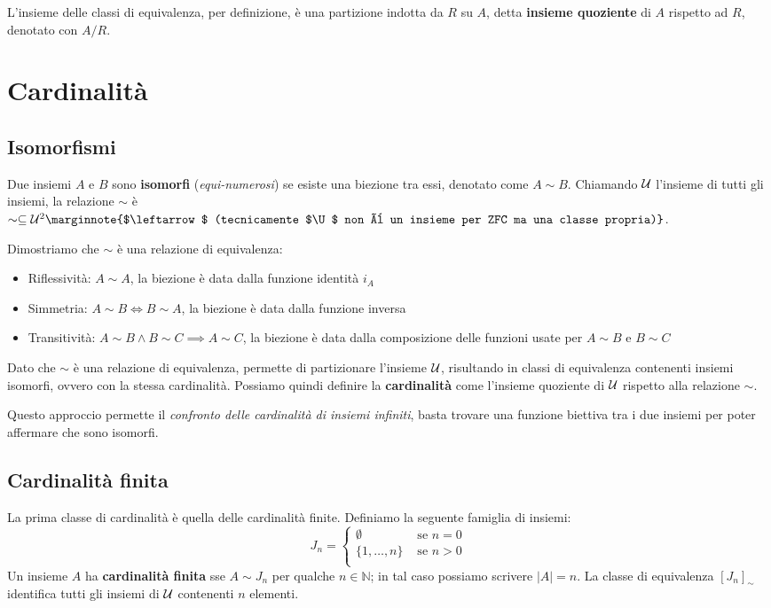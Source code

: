 L'insieme delle classi di equivalenza, per definizione, è una partizione indotta da $R$ su $A$, detta \textbf{insieme quoziente} di $A$ rispetto ad $R$, denotato con $A / R$.

\section{Cardinalità}

\subsection{Isomorfismi}

Due insiemi $A$ e $B$ sono \textbf{isomorfi} (\textit{equi-numerosi}) se esiste una biezione tra essi, denotato come $A \sim B$. Chiamando $\mathcal{U}$ l'insieme di tutti gli insiemi, la relazione $\sim$ è $\sim \subseteq \U^2 \marginnote{$\leftarrow$ (tecnicamente $\U$ non è un insieme per ZFC ma una classe propria)}$.

Dimostriamo che $\sim$ è una relazione di equivalenza: 
\begin{itemize}
	\item Riflessività: $A \sim A$, la biezione è data dalla funzione identità $i_A$
	\item Simmetria: $A \sim B \Leftrightarrow B \sim A$, la biezione è data dalla funzione inversa
	\item Transitività: $A \sim B \wedge B \sim C \implies A \sim C$, la biezione è data dalla composizione delle funzioni usate per $A \sim B$ e $B \sim C$
\end{itemize}

Dato che $\sim$ è una relazione di equivalenza, permette di partizionare l'insieme $\mathcal{U}$, risultando in classi di equivalenza contenenti insiemi isomorfi, ovvero con la stessa cardinalità. Possiamo quindi definire la \textbf{cardinalità} come l'insieme quoziente di $\mathcal{U}$ rispetto alla relazione $\sim$.

Questo approccio permette il \textit{confronto delle cardinalità di insiemi infiniti}, basta trovare una funzione biettiva tra i due insiemi per poter affermare che sono isomorfi.

\subsection{Cardinalità finita}
La prima classe di cardinalità è quella delle cardinalità finite. Definiamo la seguente famiglia di insiemi:
$$ J_n = \begin{cases}
	\emptyset & \text{ se } n = 0 \\
	\{1, \dots , n\} & \text{ se } n > 0 \\
\end{cases}$$
Un insieme $A$ ha \textbf{cardinalità finita} sse $A \sim J_n$ per qualche $n \in \mathbb{N}$; in tal caso possiamo scrivere $|A| = n$. La classe di equivalenza $[J_n]_{\sim}$ identifica tutti gli insiemi di $\mathcal{U}$ contenenti $n$ elementi.

